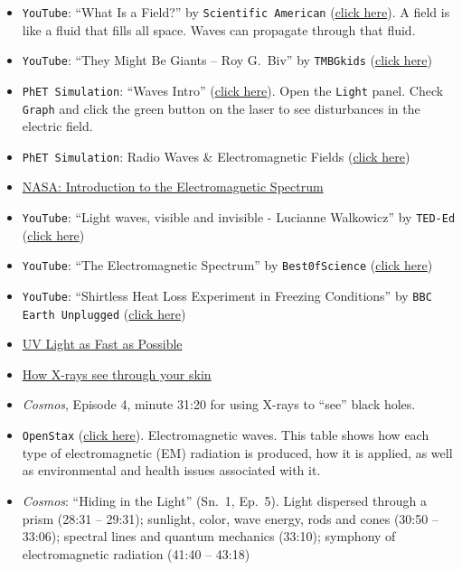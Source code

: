 \documentclass{article}
\numberwithin{equation}{section}
\numberwithin{figure}{section}
\begin{document}
\begin{itemize}
\setlength\itemsep{0.1ex}
    \item \texttt{YouTube}: ``What Is a Field?'' by \texttt{Scientific American} (\href{https://youtu.be/7BK166SL-ig}{click here}). A field is like a fluid that fills all space. Waves can propagate through that fluid.
    \item \texttt{YouTube}: ``They Might Be Giants -- Roy G.~Biv'' by \texttt{TMBGkids} (\href{https://youtu.be/Gf33ueRXMzQ}{click here})
    \item \texttt{PhET Simulation}: ``Waves Intro'' (\href{https://phet.colorado.edu/sims/html/waves-intro/latest/waves-intro_en.html}{click here}). Open the \texttt{Light} panel. Check \texttt{Graph} and click the green button on the laser to see disturbances in the electric field.
    \item \texttt{PhET Simulation}: Radio Waves \& Electromagnetic Fields (\href{https://phet.colorado.edu/sims/cheerpj/radio-waves/latest/radio-waves.html?simulation=radio-waves}{click here})
    \item \href{https://science.nasa.gov/ems/01_intro}{NASA: Introduction to the Electromagnetic Spectrum}
    \item \texttt{YouTube}: ``Light waves, visible and invisible - Lucianne Walkowicz'' by \texttt{TED-Ed} (\href{https://youtu.be/O0PawPSdk28}{click here})
    \item \texttt{YouTube}: ``The Electromagnetic Spectrum'' by \texttt{Best0fScience} (\href{https://youtu.be/cfXzwh3KadE}{click here})
    \item \texttt{YouTube}: ``Shirtless Heat Loss Experiment in Freezing Conditions'' by \texttt{BBC Earth Unplugged} (\href{https://youtu.be/o2bzGyc6WAg}{click here})
    \item \href{https://youtu.be/QALt_ja2HGY}{UV Light as Fast as Possible}
    \item \href{https://youtu.be/gsV7SJDDCY4}{How X-rays see through your skin}
    \item \textit{Cosmos}, Episode 4, minute 31:20 for using X-rays to ``see'' black holes.
    \item \texttt{OpenStax} (\href{https://openstax.org/books/physics/pages/15-1-the-electromagnetic-spectrum#Table_15_01}{click here}). Electromagnetic waves. This table shows how each type of electromagnetic (EM) radiation is produced, how it is applied, as well as environmental and health issues associated with it.
    \item \textit{Cosmos}: ``Hiding in the Light'' (Sn.~1, Ep.~5). Light dispersed through a prism (28:31 -- 29:31); sunlight, color, wave energy, rods and cones (30:50 -- 33:06); spectral lines and quantum mechanics (33:10); symphony of electromagnetic radiation (41:40 -- 43:18)
\end{itemize}

\clearpage
\printnoidxglossaries
\end{document}
